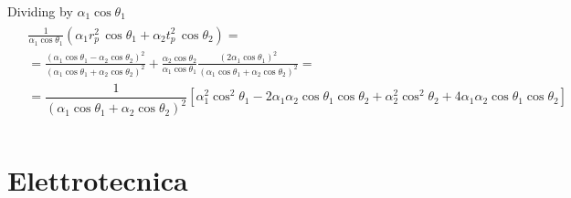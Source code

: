 \documentclass[letterpaper,10pt,italian]{jupyterBook}
\begin{document}
\sphinxAtStartPar
Dividing by \(\alpha_1 \cos  \theta_1\)
\begin{equation*}
\begin{split}\begin{aligned}
 & \frac{1}{\alpha_1 \cos \theta_1} \left( \alpha_1 r_p^2 \, \cos \theta_1 + \alpha_2 t_p^2 \, \cos \theta_2 \right) = \\
 & = \frac{\left(\alpha_1 \cos \theta_1 - \alpha_2 \cos \theta_2\right)^2}{\left(\alpha_1 \cos \theta_1 + \alpha_2 \cos \theta_2\right)^2} + \frac{\alpha_2 \cos \theta_2}{\alpha_1 \cos \theta_1} \frac{\left( 2 \alpha_1 \cos \theta_1 \right)^2}{\left( \alpha_1 \cos \theta_1 + \alpha_2 \cos \theta_2 \right)^2} = \\
  & = \dfrac{1}{\left( \alpha_1 \cos \theta_1 + \alpha_2 \cos \theta_2 \right)^2} \left[ \alpha_1^2 \cos^2 \theta_1 - 2 \alpha_1 \alpha_2 \cos \theta_1 \cos \theta_2 + \alpha_2^2 \cos^2 \theta_2 + 4 \alpha_1 \alpha_2 \cos \theta_1 \cos \theta_2 \right] \\
\end{aligned}\end{split}
\end{equation*}
\sphinxstepscope


\part{Elettrotecnica}

\sphinxstepscope
\end{document}
